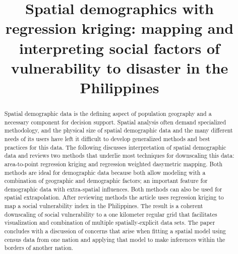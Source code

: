 \documentclass[]{interact}
\theoremstyle{plain}%
\theoremstyle{definition}
\theoremstyle{remark}
\begin{document}

\title{Spatial demographics with regression kriging: mapping and interpreting social factors of vulnerability to disaster in the Philippines}


\maketitle

\begin{abstract}
  Spatial demographic data is the defining aspect of population geography and a necessary component for decision support.  Spatial analysis often demand specialized methodology, and the physical size of spatial demographic data and the many different needs of its users have left it difficult to develop generalized methods and best practices for this data.  The following discusses interpretation of spatial demographic data and reviews two methods that underlie most techniques for downscaling this data: area-to-point regression kriging and regression weighted dasymetric mapping.  Both methods are ideal for demographic data because both allow modeling with a combination of geographic and demographic factors; an important feature for demographic data with extra-spatial influences.  Both methods can also be used for spatial extrapolation.  After reviewing methods the article uses regression kriging to map a social vulnerability index in the Philippines.  The result is a coherent downscaling of social vulnerability to a one kilometer regular grid that facilitates visualization and combination of multiple spatially-explicit data sets.  The paper concludes with a discussion of concerns that arise when fitting a spatial model using census data from one nation and applying that model to make inferences within the borders of another nation.
\end{abstract}

\end{document}
